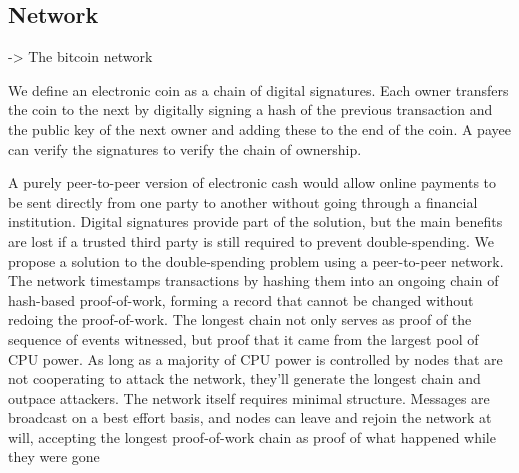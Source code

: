 \subsection{Network}
->
The bitcoin network

We define an electronic coin as a chain of digital signatures. Each owner transfers the coin to the
next by digitally signing a hash of the previous transaction and the public key of the next owner
and adding these to the end of the coin. A payee can verify the signatures to verify the chain of
ownership.


A purely peer-to-peer version of electronic cash would allow online
payments to be sent directly from one party to another without going through a
financial institution. Digital signatures provide part of the solution, but the main
benefits are lost if a trusted third party is still required to prevent double-spending.
We propose a solution to the double-spending problem using a peer-to-peer network.
The network timestamps transactions by hashing them into an ongoing chain of
hash-based proof-of-work, forming a record that cannot be changed without redoing
the proof-of-work. The longest chain not only serves as proof of the sequence of
events witnessed, but proof that it came from the largest pool of CPU power. As
long as a majority of CPU power is controlled by nodes that are not cooperating to
attack the network, they'll generate the longest chain and outpace attackers. The
network itself requires minimal structure. Messages are broadcast on a best effort
basis, and nodes can leave and rejoin the network at will, accepting the longest
proof-of-work chain as proof of what happened while they were gone



    
    

    



